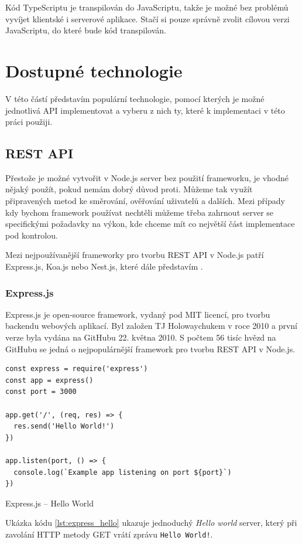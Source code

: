\documentclass[thesis=M,czech]{FITthesis}[2019/12/23]
\begin{document}
Kód TypeScriptu je transpilován do JavaScriptu, takže je možné bez problémů vyvíjet klientské i serverové aplikace. Stačí si pouze správně zvolit cílovou verzi JavaScriptu, do které bude kód transpilován.

\chapter{Dostupné technologie}
V této částí představím populární technologie, pomocí kterých je možné jednotlivá API implementovat a vyberu z nich ty, které k implementaci v této práci použiji. 

\section{REST API}
Přestože je možné vytvořit v Node.js server bez použití frameworku, je vhodné nějaký použít, pokud nemám dobrý důvod proti.
 Můžeme tak využít připravených metod ke směrování, ověřování uživatelů a dalších. Mezi případy kdy bychom framework používat nechtěli můžeme třeba zahrnout server se specifickými požadavky na výkon, kde chceme mít co největší část implementace pod kontrolou.

Mezi nejpoužívanější frameworky pro tvorbu REST API v Node.js patří Express.js, Koa.js nebo Nest.js, které dále představím \cite{rest_trends}.
\subsection{Express.js}
Express.js \cite{express} je open-source framework, vydaný pod MIT licencí, pro tvorbu backendu webových aplikací. Byl založen TJ Holowaychukem v roce 2010 a první verze byla vydána na GitHubu 22. května 2010. S počtem 56 tisíc hvězd na GitHubu se jedná o nejpopulárnější framework pro tvorbu REST API v Node.js.

\begin{listing}[h]
\begin{verbatim}
const express = require('express')
const app = express()
const port = 3000

app.get('/', (req, res) => {
  res.send('Hello World!')
})

app.listen(port, () => {
  console.log(`Example app listening on port ${port}`)
})
\end{verbatim}
\caption{Express.js -- Hello World}
\label{lst:express_hello}
\end{listing}

Ukázka kódu \ref{lst:express_hello} ukazuje jednoduchý \textit{Hello world} server, který při zavolání HTTP metody GET vrátí zprávu \texttt{Hello World!}. 
\end{document}
